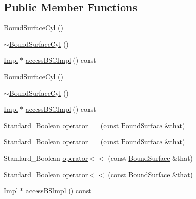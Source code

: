 \subsection*{Public Member Functions}
\begin{DoxyCompactItemize}
\item 
\hyperlink{classMcCAD_1_1Geometry_1_1BoundSurfaceCyl_af24dcff5a5272064a23985d082e37d08}{Bound\+Surface\+Cyl} ()
\item 
\hyperlink{classMcCAD_1_1Geometry_1_1BoundSurfaceCyl_a68fe26bd760aec66c95b254edd19b98f}{$\sim$\+Bound\+Surface\+Cyl} ()
\item 
\hyperlink{classMcCAD_1_1Geometry_1_1BoundSurfaceCyl_1_1Impl}{Impl} $\ast$ \hyperlink{classMcCAD_1_1Geometry_1_1BoundSurfaceCyl_adccde795b27781d31cf81c0226d7eb89}{access\+B\+S\+C\+Impl} () const
\item 
\hyperlink{classMcCAD_1_1Geometry_1_1BoundSurfaceCyl_af24dcff5a5272064a23985d082e37d08}{Bound\+Surface\+Cyl} ()
\item 
\hyperlink{classMcCAD_1_1Geometry_1_1BoundSurfaceCyl_a68fe26bd760aec66c95b254edd19b98f}{$\sim$\+Bound\+Surface\+Cyl} ()
\item 
\hyperlink{classMcCAD_1_1Geometry_1_1BoundSurfaceCyl_1_1Impl}{Impl} $\ast$ \hyperlink{classMcCAD_1_1Geometry_1_1BoundSurfaceCyl_a160f3f6495a9415b419f43444bb59902}{access\+B\+S\+C\+Impl} () const
\item 
Standard\+\_\+\+Boolean \hyperlink{classMcCAD_1_1Geometry_1_1BoundSurface_a5c7eafa600bd89b55fa06ddb9b21cc08}{operator==} (const \hyperlink{classMcCAD_1_1Geometry_1_1BoundSurface}{Bound\+Surface} \&that)
\item 
Standard\+\_\+\+Boolean \hyperlink{classMcCAD_1_1Geometry_1_1BoundSurface_a5c7eafa600bd89b55fa06ddb9b21cc08}{operator==} (const \hyperlink{classMcCAD_1_1Geometry_1_1BoundSurface}{Bound\+Surface} \&that)
\item 
Standard\+\_\+\+Boolean \hyperlink{classMcCAD_1_1Geometry_1_1BoundSurface_a2443caf3cbbe81e666df60745a92db28}{operator$<$$<$} (const \hyperlink{classMcCAD_1_1Geometry_1_1BoundSurface}{Bound\+Surface} \&that)
\item 
Standard\+\_\+\+Boolean \hyperlink{classMcCAD_1_1Geometry_1_1BoundSurface_a2443caf3cbbe81e666df60745a92db28}{operator$<$$<$} (const \hyperlink{classMcCAD_1_1Geometry_1_1BoundSurface}{Bound\+Surface} \&that)
\item 
\hyperlink{classMcCAD_1_1Geometry_1_1BoundSurfaceCyl_1_1Impl}{Impl} $\ast$ \hyperlink{classMcCAD_1_1Geometry_1_1BoundSurface_aaf5a1d89894e9a90fee2e1f355638d0b}{access\+B\+S\+Impl} () const

\end{DoxyCompactItemize}
